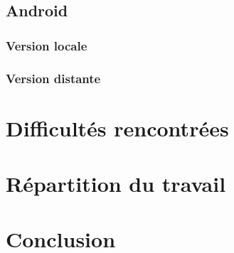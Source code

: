 \documentclass{beamer}
\begin{document}
\subsection{Android}
\subsubsection{Version locale}
\begin{frame}
\end{frame}
\subsubsection{Version distante}
\begin{frame}
\end{frame}


\section{Difficultés rencontrées}
\begin{frame}
\end{frame}


\section{Répartition du travail}
\begin{frame}
\end{frame}


\section{Conclusion}
\begin{frame}
\end{frame}
\end{document}
